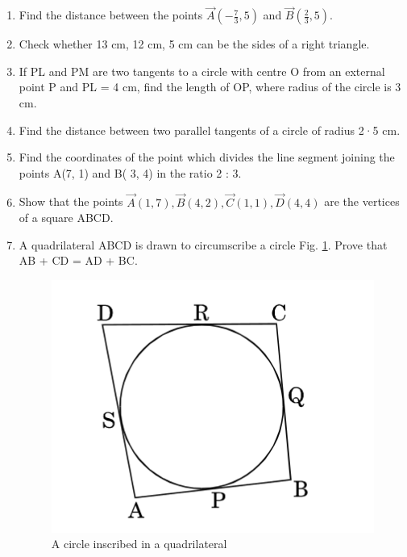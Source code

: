 \documentclass{article}
\begin{document}
\begin{enumerate}
		\item Find the distance between the points $\vec{A} (-\frac{7}{3},5)$ and $\vec{B} (\frac{2}{3},5)$.

		\item Check whether 13 cm, 12 cm, 5 cm can be the sides of a right triangle.
		
        \item If PL and PM are two tangents to a circle with centre O from an external point P and PL = 4 cm, find the length of OP, where radius of the circle is 3 cm.
			
        \item Find the distance between two parallel tangents of a circle of radius 2·5 cm. 

		\item Find the coordinates of the point which divides the line segment joining the points A(7, 1) and B( 3, 4) in the ratio 2 : 3. 

		\item Show that the points $\vec{A}(1,7), \vec{B}(4,2), \vec{C}(1,1), \vec{D}(4,4)$ are the vertices of a square ABCD. 

		\item A quadrilateral ABCD is drawn to circumscribe a circle Fig. \ref{fig:leaf}. Prove that AB + CD = AD + BC.

		\begin{figure}[h]
        \centering
        \includegraphics[width=\columnwidth]{figs/2.jpg}
        \caption{A circle inscribed in a quadrilateral}
        \label{fig:leaf}
        \end{figure}


\end{enumerate}
\end{document}
